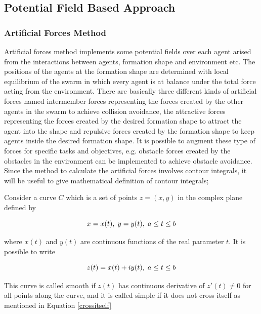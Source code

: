 \subsection{Potential Field Based Approach}

\subsubsection{Artificial Forces Method} \label{Artificial Forces Ref}
Artificial forces method implements some potential fields over each agent arised from the interactions between agents, formation shape and environment etc. The positions of the agents at the formation shape  are determined with local equilibrium of the swarm in which every agent is at balance under the total force acting from the environment. There are basically three different kinds of artificial forces named intermember forces representing the forces created by the other agents in the swarm to achieve collision avoidance, the attractive forces representing the forces created by the desired formation shape to attract the agent into the shape and repulsive forces created by the formation shape to keep agents inside the desired formation shape. It is possible to augment these type of forces for specific tasks and objectives, e.g. obstacle forces created by the obstacles in the environment can be implemented to achieve obstacle avoidance.
Since the method to calculate the artificial forces involves contour integrals, it will be useful to give mathematical definition of contour integrals;
		
Consider a curve $C$ which is a set of points $z = (x,y)$ in the complex plane defined by

\begin{equation}
x = x(t),   \hspace{0.1cm} y = y(t),  \hspace{0.1cm} a\leq t \leq b
\end{equation}

where $x(t)$ and $y(t)$ are continuous functions of the real parameter $t$.  It is possible to write
		
\begin{equation}
z(t) = x(t)+iy(t),   \hspace{0.1cm} a\leq t \leq b
\end{equation}
		
This curve is called smooth if $z(t)$ has continuous derivative of $z'(t) \neq 0$ for all points along the curve, and it is called simple if it does not cross itself as mentioned in Equation \ref{crossitself}


